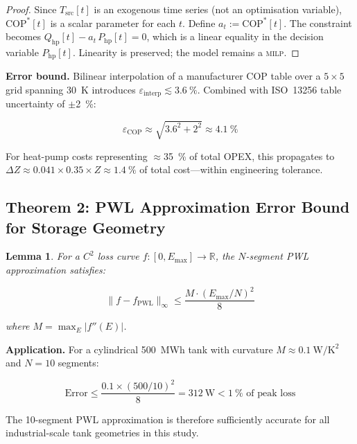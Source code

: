 \documentclass[a4paper,fleqn]{cas-sc}
\newtheorem{lemma}[theorem]{Lemma}
\newcommand{\Qhp}{Q_{\mathrm{hp}}}
\newcommand{\Php}{P_{\mathrm{hp}}}
\newcommand{\COP}{\mathrm{COP}}
\newcommand{\milp}{\textsc{milp}}
\begin{document}
\begin{proof}
Since $T_{\mathrm{src}}[t]$ is an exogenous time series (not an optimisation
variable), $\COP^*[t]$ is a scalar parameter for each $t$.  Define
$a_t := \COP^*[t]$.  The constraint becomes
$\Qhp[t] - a_t\,\Php[t] = 0$, which is a linear equality in the
decision variable $\Php[t]$.  Linearity is preserved; the model remains
a \milp{}.
\end{proof}

\textbf{Error bound.}  Bilinear interpolation of a manufacturer COP
table over a $5 \times 5$ grid spanning \SI{30}{\kelvin} introduces
$\varepsilon_{\mathrm{interp}} \lesssim \SI{3.6}{\percent}$.  Combined
with ISO~13256 table uncertainty of $\pm$\SI{2}{\percent}:

\begin{equation}
  \varepsilon_{\COP} \approx \sqrt{3.6^2 + 2^2} \approx \SI{4.1}{\percent}
\end{equation}

For heat-pump costs representing $\approx$\SI{35}{\percent} of total OPEX, this
propagates to $\Delta Z \approx 0.041 \times 0.35 \times Z \approx
\SI{1.4}{\percent}$ of total cost---within engineering tolerance.

\subsection{Theorem 2: PWL Approximation Error Bound for Storage Geometry}
\label{app:proof_pwl}

\begin{lemma}
For a $C^2$ loss curve $f:[0,E_{\max}] \to \mathbb{R}$, the $N$-segment
PWL approximation satisfies:

\begin{equation}
  \|f - f_{\mathrm{PWL}}\|_\infty
  \leq \frac{M \cdot (E_{\max}/N)^2}{8}
\end{equation}

where $M = \max_{E}|f''(E)|$.
\end{lemma}

\textbf{Application.}  For a cylindrical \SI{500}{MWh} tank with
curvature $M \approx \SI{0.1}{\watt\per\square\kelvin}$ and $N=10$
segments:

\begin{equation}
  \text{Error} \leq \frac{0.1 \times (500/10)^2}{8}
  = \SI{312}{\watt} < \SI{1}{\percent} \text{ of peak loss}
\end{equation}

The 10-segment PWL approximation is therefore sufficiently accurate for
all industrial-scale tank geometries in this study.




\end{document}
